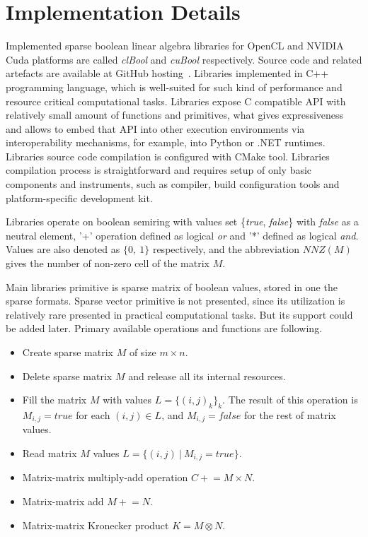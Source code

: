 \section{Implementation Details}



Implemented sparse boolean linear algebra libraries for OpenCL and NVIDIA Cuda platforms are called
\textit{clBool} and \textit{cuBool} respectively. Source code and related artefacts are available at GitHub 
hosting~\cite{todo1, todo2}. Libraries implemented in C++ programming language, which is well-suited for such 
kind of performance and resource critical computational tasks. Libraries expose C compatible API with 
relatively small amount of functions and primitives, what gives expressiveness and allows to embed that API 
into other execution environments via interoperability mechanisms, for example, into Python or .NET runtimes. 
Libraries source code compilation is configured with CMake tool. Libraries compilation process is 
straightforward and requires setup of only basic components and instruments, such as compiler, build 
configuration tools and platform-specific development kit.

Libraries operate on boolean semiring with values set \{\textit{true}, \textit{false}\} with \textit{false} as 
a neutral element, '+' operation defined as logical \textit{or} and '*' defined as logical \textit{and}. Values are also denoted as $\{0,~1\}$ respectively, and the abbreviation $NNZ(M)$ gives the number of non-zero cell of the matrix $M$.

Main libraries primitive is sparse matrix of boolean values, stored in one the sparse formats. Sparse vector 
primitive is not presented, since its utilization is relatively rare presented in practical computational 
tasks. But its support could be added later. Primary available operations and functions are following.

\begin{itemize}
    \item Create sparse matrix $M$ of size $m \times n$.
    \item Delete sparse matrix $M$ and release all its internal resources.
    \item Fill the matrix $M$ with values $L = \{(i,j)_k\}_k$. The result of this operation is $M_{i,j} = 
    \textit{true}$ for each $(i, j) \in L$, and $M_{i,j} = \textit{false}$ for the rest of matrix values.
    \item Read matrix $M$ values $L = \{(i, j)~|~M_{i,j} = \textit{true}\}$.
    \item Matrix-matrix multiply-add operation $C \mathrel{+}= M \times N$.
    \item Matrix-matrix add $M \mathrel{+}= N$.
    \item Matrix-matrix Kronecker product $K = M \otimes N$.
\end{itemize}

